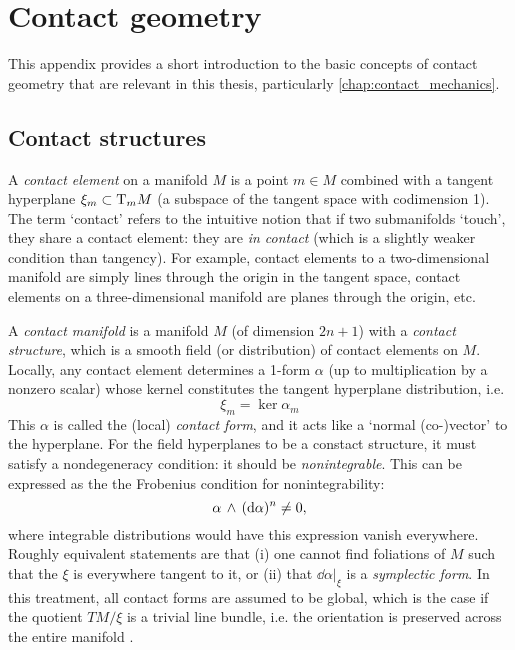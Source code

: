 \chapter{Contact geometry}
\label{app:contact_geometry}
This appendix provides a short introduction to the basic concepts of contact geometry that are relevant in this thesis, particularly \cref{chap:contact_mechanics}.

\section{Contact structures}
\label{sec:contact_structures}
A \emph{contact element} on a manifold $M$ is a point $m \in M$ combined with a tangent hyperplane $\xi_m \subset \mathrm{T}_mM$ (a subspace of the tangent space  with codimension 1). The term `contact' refers to the intuitive notion that if two submanifolds `touch', they share a contact element: they are \emph{in contact} (which is a slightly weaker condition than tangency). \cite{Cannas2001} For example, contact elements to a two-dimensional manifold are simply lines through the origin in the tangent space, contact elements on a three-dimensional manifold are planes through the origin, etc.

A \emph{contact manifold} is a manifold $M$ (of dimension $2n+1$) with a \emph{contact structure}, which is a smooth field (or distribution) of contact elements on $M$. Locally, any contact element determines a 1-form $\alpha$ (up to multiplication by a nonzero scalar) whose kernel constitutes the tangent hyperplane distribution, i.e. 
\begin{equation}
    \xi_m = \ker \alpha_m
    \label{eq:contact_form}
\end{equation}
This $\alpha$ is called the (local) \emph{contact form}, and it acts like a `normal (co-)vector' to the hyperplane. For the field hyperplanes to be a constact structure, it must satisfy a nondegeneracy condition: it should be \emph{nonintegrable}. This can be expressed as the the Frobenius condition for nonintegrability: \cite{Cannas2001,Abraham1978,Arnold1989}
$$  \alpha\,\wedge\,(\dd{\alpha})^n  \neq 0, $$
where integrable distributions would have this expression vanish everywhere. Roughly equivalent statements are that (i) one cannot find foliations of $M$ such that the $\xi$ is everywhere tangent to it, or (ii) that $\dd{\alpha}\vert_\xi$ is a \emph{symplectic form}. In this treatment, all contact forms are assumed to be global, which is the case if the quotient $TM/\xi$ is a trivial line bundle, i.e. the orientation is preserved across the entire manifold \cite{Geiges2008}.

